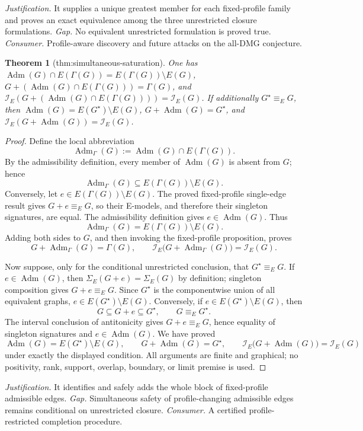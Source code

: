 \documentclass{article}
\newtheorem{theorem}{Theorem}
\begin{document}
\par\smallskip\noindent \textit{Justification.} It supplies a unique greatest member for each fixed-profile family and proves an exact equivalence among the three unrestricted closure formulations. \textit{Gap.} No equivalent unrestricted formulation is proved true. \textit{Consumer.} Profile-aware discovery and future attacks on the all-DMG conjecture.

\begin{theorem}[thm:simultaneous-saturation]\label{thm:simultaneous-saturation}
One has \(\operatorname{Adm}(G)\cap E(\Gamma(G))=E(\Gamma(G))\setminus E(G)\), \(G+(\operatorname{Adm}(G)\cap E(\Gamma(G)))=\Gamma(G)\), and \(\mathcal I_E(G+(\operatorname{Adm}(G)\cap E(\Gamma(G))))=\mathcal I_E(G)\). If additionally \(G^\star\equiv_EG\), then \(\operatorname{Adm}(G)=E(G^\star)\setminus E(G)\), \(G+\operatorname{Adm}(G)=G^\star\), and \(\mathcal I_E(G+\operatorname{Adm}(G))=\mathcal I_E(G)\).
\end{theorem}
\begin{proof}
Define the local abbreviation
\[
 \operatorname{Adm}_{\Gamma}(G)
 :=\operatorname{Adm}(G)\cap E(\Gamma(G)).
\]
By the admissibility definition, every member of \(\operatorname{Adm}(G)\) is absent from \(G\); hence
\[
 \operatorname{Adm}_{\Gamma}(G)
 \subseteq E(\Gamma(G))\setminus E(G).
\]
Conversely, let \(e\in E(\Gamma(G))\setminus E(G)\).  The proved fixed-profile single-edge result gives \(G+e\equiv_EG\), so their E-models, and therefore their singleton signatures, are equal.  The admissibility definition gives \(e\in\operatorname{Adm}(G)\).  Thus
\[
 \operatorname{Adm}_{\Gamma}(G)=E(\Gamma(G))\setminus E(G).
\]
Adding both sides to \(G\), and then invoking the fixed-profile proposition, proves
\[
 G+\operatorname{Adm}_{\Gamma}(G)=\Gamma(G),
 \qquad
 \mathcal I_E\bigl(G+\operatorname{Adm}_{\Gamma}(G)\bigr)=\mathcal I_E(G).
\]

Now suppose, only for the conditional unrestricted conclusion, that \(G^\star\equiv_EG\).  If \(e\in\operatorname{Adm}(G)\), then \(\Sigma_E(G+e)=\Sigma_E(G)\) by definition; singleton composition gives \(G+e\equiv_EG\).  Since \(G^\star\) is the componentwise union of all equivalent graphs, \(e\in E(G^\star)\setminus E(G)\).  Conversely, if \(e\in E(G^\star)\setminus E(G)\), then
\[
 G\subseteq G+e\subseteq G^\star,
 \qquad G\equiv_EG^\star.
\]
The interval conclusion of antitonicity gives \(G+e\equiv_EG\), hence equality of singleton signatures and \(e\in\operatorname{Adm}(G)\).  We have proved
\[
 \operatorname{Adm}(G)=E(G^\star)\setminus E(G),
 \qquad
 G+\operatorname{Adm}(G)=G^\star,
 \qquad
 \mathcal I_E\bigl(G+\operatorname{Adm}(G)\bigr)=\mathcal I_E(G)
\]
under exactly the displayed condition.  All arguments are finite and graphical; no positivity, rank, support, overlap, boundary, or limit premise is used.
\end{proof}
\par\smallskip\noindent \textit{Justification.} It identifies and safely adds the whole block of fixed-profile admissible edges. \textit{Gap.} Simultaneous safety of profile-changing admissible edges remains conditional on unrestricted closure. \textit{Consumer.} A certified profile-restricted completion procedure.
\end{document}
